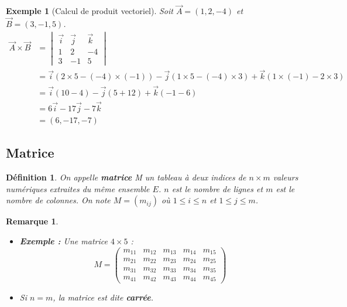 \documentclass{article}
\newtheorem{definition}{Définition}
\newtheorem{remark}{Remarque}
\newtheorem{example}{Exemple}
\begin{document}
\begin{example}[Calcul de produit vectoriel]
Soit $\vec{A} = (1, 2, -4)$ et $\vec{B} = (3, -1, 5)$.
\begin{align*} \vec{A} \times \vec{B} &= \begin{vmatrix} \vec{i} & \vec{j} & \vec{k} \\ 1 & 2 & -4 \\ 3 & -1 & 5 \end{vmatrix} \\ &= \vec{i}(2 \times 5 - (-4) \times (-1)) - \vec{j}(1 \times 5 - (-4) \times 3) + \vec{k}(1 \times (-1) - 2 \times 3) \\ &= \vec{i}(10 - 4) - \vec{j}(5 + 12) + \vec{k}(-1 - 6) \\ &= 6\vec{i} - 17\vec{j} - 7\vec{k} \\ &= (6, -17, -7) \end{align*}
\end{example}
\subsection{Matrice}
\begin{definition}
On appelle \textbf{matrice} M un tableau à deux indices de $n \times m$ valeurs numériques extraites du même ensemble $E$. $n$ est le nombre de lignes et $m$ est le nombre de colonnes. On note $M = (m_{ij})$ où $1 \le i \le n$ et $1 \le j \le m$.
\end{definition}
\begin{remark}
\begin{itemize}
    \item \textbf{Exemple :} Une matrice $4 \times 5$ :
    \[ M = \begin{pmatrix} m_{11} & m_{12} & m_{13} & m_{14} & m_{15} \\ m_{21} & m_{22} & m_{23} & m_{24} & m_{25} \\ m_{31} & m_{32} & m_{33} & m_{34} & m_{35} \\ m_{41} & m_{42} & m_{43} & m_{44} & m_{45} \end{pmatrix} \]
    \item Si $n=m$, la matrice est dite \textbf{carrée}.
\end{itemize}
\end{remark}
\end{document}
